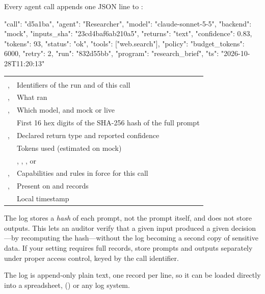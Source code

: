 Every agent call appends one JSON line to :

\begin{plaincode}[title=one audit record (pretty-printed)]
{
  "call": "d5a1ba",
  "agent": "Researcher",
  "model": "claude-sonnet-5-5",
  "backend": "mock",
  "inputs_sha": "23cd4baf6ab210a5",
  "returns": "text",
  "confidence": 0.83,
  "tokens": 93,
  "status": "ok",
  "tools": ["web.search"],
  "policy": {"budget_tokens": 6000, "retry": 2},
  "run": "832d55bb",
  "program": "research_brief",
  "ts": "2026-10-28T11:20:13"
}
\end{plaincode}

\begin{center}
\small
\begin{tabularx}{\linewidth}{@{}L{2.4cm}Y@{}}
\toprule
{} & \\
\goldrule
{},  & Identifiers of the run and of this call\\
,  & What ran\\
,  & Which model, and mock or live\\
 & First 16 hex digits of the SHA-256 hash of the full prompt\\
,  & Declared return type and reported confidence\\
 & Tokens used (estimated on mock)\\
 & , , ,  or \\
,  & Capabilities and rules in force for this call\\
,  & Present on  and  records\\
 & Local timestamp\\
\bottomrule
\end{tabularx}
\end{center}

\begin{ethics}
The log stores a \emph{hash} of each prompt, not the prompt itself, and does not store outputs. This lets an auditor verify that a given input produced a given decision---by recomputing the hash---without the log becoming a second copy of sensitive data. If your setting requires full records, store prompts and outputs separately under proper access control, keyed by the call identifier.
\end{ethics}

The log is append-only plain text, one record per line, so it can be loaded directly into a spreadsheet,  () or any log system.

